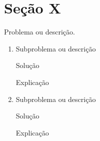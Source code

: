 \section*{Seção X}

\begin{problem}
Problema ou descrição.
\end{problem}

\begin{enumerate}
  \item
    \begin{problem}
      Subproblema ou descrição
	\end{problem}
    \begin{solution}
      Solução
    \end{solution}
    \begin{reflection}
      Explicação
	\end{reflection}

  \item
    \begin{problem}
      Subproblema ou descrição
    \end{problem}
    \begin{solution}
      Solução
    \end{solution}
    \begin{reflection}
      Explicação
    \end{reflection}	

\end{enumerate}
